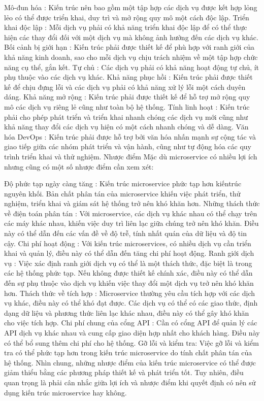 Mô-đun hóa : Kiến trúc nên bao gồm một tập hợp các dịch vụ được kết hợp lỏng lẻo có thể được triển khai, duy trì và mở rộng quy mô một cách độc lập.
Triển khai độc lập : Mỗi dịch vụ phải có khả năng triển khai độc lập để có thể thực hiện các thay đổi đối với một dịch vụ mà không ảnh hưởng đến các dịch vụ khác.
Bối cảnh bị giới hạn : Kiến trúc phải được thiết kế để phù hợp với ranh giới của khả năng kinh doanh, sao cho mỗi dịch vụ chịu trách nhiệm về một tập hợp chức năng cụ thể, gắn kết.
Tự chủ : Các dịch vụ phải có khả năng hoạt động tự chủ, ít phụ thuộc vào các dịch vụ khác.
Khả năng phục hồi : Kiến trúc phải được thiết kế để chịu đựng lỗi và các dịch vụ phải có khả năng xử lý lỗi một cách duyên dáng.
Khả năng mở rộng : Kiến trúc phải được thiết kế để hỗ trợ mở rộng quy mô các dịch vụ riêng lẻ cũng như toàn bộ hệ thống.
Tính linh hoạt : Kiến trúc phải cho phép phát triển và triển khai nhanh chóng các dịch vụ mới cũng như khả năng thay đổi các dịch vụ hiện có một cách nhanh chóng và dễ dàng.
Văn hóa DevOps : Kiến trúc phải được hỗ trợ bởi văn hóa nhấn mạnh sự cộng tác và giao tiếp giữa các nhóm phát triển và vận hành, cũng như tự động hóa các quy trình triển khai và thử nghiệm.
Nhược điểm
Mặc dù microservice có nhiều lợi ích nhưng cũng có một số nhược điểm cần xem xét:

Độ phức tạp ngày càng tăng : Kiến trúc microservice phức tạp hơn kiến ​​trúc nguyên khối. Bản chất phân tán của microservice khiến việc phát triển, thử nghiệm, triển khai và giám sát hệ thống trở nên khó khăn hơn.
Những thách thức về điện toán phân tán : Với microservice, các dịch vụ khác nhau có thể chạy trên các máy khác nhau, khiến việc duy trì liên lạc giữa chúng trở nên khó khăn. Điều này có thể dẫn đến các vấn đề về độ trễ, tính nhất quán của dữ liệu và độ tin cậy.
Chi phí hoạt động : Với kiến ​​trúc microservices, có nhiều dịch vụ cần triển khai và quản lý, điều này có thể dẫn đến tăng chi phí hoạt động.
Ranh giới dịch vụ : Việc xác định ranh giới dịch vụ có thể là một thách thức, đặc biệt là trong các hệ thống phức tạp. Nếu không được thiết kế chính xác, điều này có thể dẫn đến sự phụ thuộc vào dịch vụ khiến việc thay đổi một dịch vụ trở nên khó khăn hơn.
Thách thức về tích hợp : Microservice thường yêu cầu tích hợp với các dịch vụ khác, điều này có thể khó đạt được. Các dịch vụ có thể có các giao thức, định dạng dữ liệu và phương thức liên lạc khác nhau, điều này có thể gây khó khăn cho việc tích hợp.
Chi phí chung của cổng API : Cần có cổng API để quản lý các API dịch vụ khác nhau và cung cấp giao diện hợp nhất cho khách hàng. Điều này có thể bổ sung thêm chi phí cho hệ thống.
Gỡ lỗi và kiểm tra: Việc gỡ lỗi và kiểm tra có thể phức tạp hơn trong kiến ​​trúc microservice do tính chất phân tán của hệ thống.
Nhìn chung, những nhược điểm của kiến ​​trúc microservice có thể được giảm thiểu bằng các phương pháp thiết kế và phát triển tốt. Tuy nhiên, điều quan trọng là phải cân nhắc giữa lợi ích và nhược điểm khi quyết định có nên sử dụng kiến ​​trúc microservice hay không.

